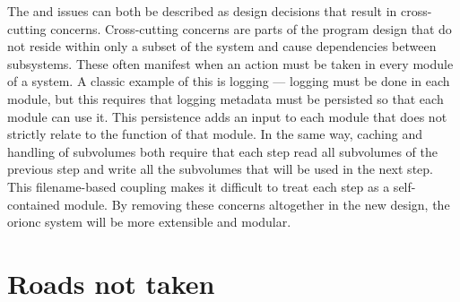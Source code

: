 The  and 
issues can both be described as design decisions that result in cross-cutting
concerns. Cross-cutting concerns are parts of the program design
that do not reside within only a subset of the system and cause
dependencies between subsystems. These often manifest when an
action must be taken in every module of a system. A classic
example of this is logging --- logging must be done in each
module, but this requires that logging metadata must be persisted
so that each module can use it. This persistence adds an input to
each module that does not strictly relate to the function of
that module. In the same way, caching and handling of subvolumes
both require that each step read all subvolumes of the previous
step and write all the subvolumes that will be used in the next
step. This filename-based coupling makes it difficult to treat
each step as a self-contained module. By removing these concerns
altogether in the new design, the \gls{orionc} system will be more
extensible and modular.

\section{Roads not taken}

